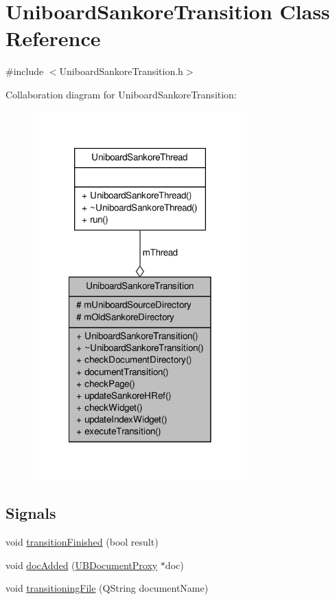 \hypertarget{class_uniboard_sankore_transition}{\section{Uniboard\-Sankore\-Transition Class Reference}
\label{df/d64/class_uniboard_sankore_transition}
}


{\ttfamily \#include $<$Uniboard\-Sankore\-Transition.\-h$>$}



Collaboration diagram for Uniboard\-Sankore\-Transition\-:
\nopagebreak
\begin{figure}[H]
\begin{center}
\leavevmode
\includegraphics[width=234pt]{d4/daf/class_uniboard_sankore_transition__coll__graph}
\end{center}
\end{figure}
\subsection*{Signals}
\begin{DoxyCompactItemize}
\item 
void \hyperlink{class_uniboard_sankore_transition_a50f8659c57e4989ac789a0c81d7e8509}{transition\-Finished} (bool result)
\item 
void \hyperlink{class_uniboard_sankore_transition_a63a35519be0aa0652fc7ba1679249549}{doc\-Added} (\hyperlink{class_u_b_document_proxy}{U\-B\-Document\-Proxy} $\ast$doc)
\item 
void \hyperlink{class_uniboard_sankore_transition_ac85cd549e8ef554a0f29618c5b6de561}{transitioning\-File} (Q\-String document\-Name)
\end{DoxyCompactItemize}
